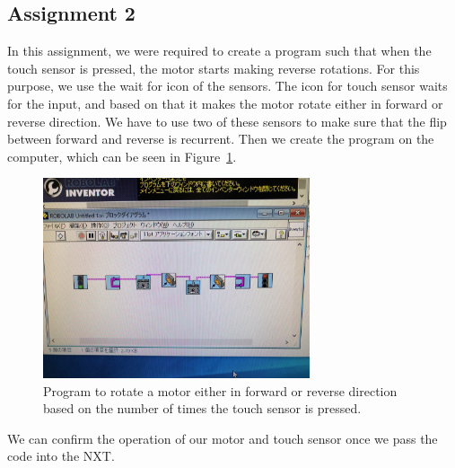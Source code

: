 \documentclass[12pt,a4paper]{report}
\begin{document}
\subsection{\textbf{Assignment 2}}
In this assignment, we were required to create a program such that when the touch sensor is pressed, 
the motor starts making reverse rotations. 
For this purpose, we use the wait for icon of the sensors. The icon for touch sensor waits for the input, 
and based on that it makes the motor rotate either in forward or reverse direction. We have to use two of 
these sensors to make sure that the flip between forward and reverse is recurrent.  
Then we create the program on the computer, which can be seen in Figure~\ref{fig:ass2-1}. 
\begin{figure}[htbp]
    \centering
    \includegraphics[width=0.7\textwidth]{figures/ass2-1.jpg}
    \caption{Program to rotate a motor either in forward or reverse direction based on the number of times the touch sensor is pressed.}
    \label{fig:ass2-1}
\end{figure}
We can confirm the operation of our motor and touch sensor once we pass the code into the NXT. 
\end{document}
